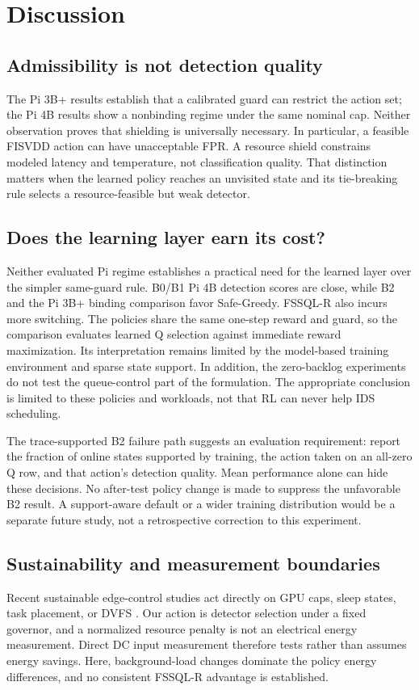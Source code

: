 \documentclass[journal]{IEEEtran}
\begin{document}
\section{Discussion}
\subsection{Admissibility is not detection quality}
The Pi 3B+ results establish that a calibrated guard can restrict the action set; the Pi 4B results show a nonbinding regime under the same nominal cap. Neither observation proves that shielding is universally necessary. In particular, a feasible FISVDD action can have unacceptable FPR. A resource shield constrains modeled latency and temperature, not classification quality. That distinction matters when the learned policy reaches an unvisited state and its tie-breaking rule selects a resource-feasible but weak detector.

\subsection{Does the learning layer earn its cost?}
Neither evaluated Pi regime establishes a practical need for the learned layer over the simpler same-guard rule. B0/B1 Pi 4B detection scores are close, while B2 and the Pi 3B+ binding comparison favor Safe-Greedy. FSSQL-R also incurs more switching. The policies share the same one-step reward and guard, so the comparison evaluates learned Q selection against immediate reward maximization. Its interpretation remains limited by the model-based training environment and sparse state support. In addition, the zero-backlog experiments do not test the queue-control part of the formulation. The appropriate conclusion is limited to these policies and workloads, not that RL can never help IDS scheduling.

The trace-supported B2 failure path suggests an evaluation requirement: report the fraction of online states supported by training, the action taken on an all-zero Q row, and that action's detection quality. Mean performance alone can hide these decisions. No after-test policy change is made to suppress the unfavorable B2 result. A support-aware default or a wider training distribution would be a separate future study, not a retrospective correction to this experiment.

\subsection{Sustainability and measurement boundaries}
Recent sustainable edge-control studies act directly on GPU caps, sleep states, task placement, or DVFS \cite{wang2024drlcap,ko2025rass,gao2025inc,li2025dvfsedge}. Our action is detector selection under a fixed governor, and a normalized resource penalty is not an electrical energy measurement. Direct DC input measurement therefore tests rather than assumes energy savings. Here, background-load changes dominate the policy energy differences, and no consistent FSSQL-R advantage is established.
\end{document}
